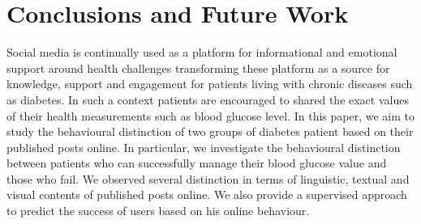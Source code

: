 \documentclass{acm_proc_article-sp}
\begin{document}
\section{Conclusions and Future Work}

Social media is continually used as a platform for informational and emotional support around health challenges transforming these platform as a source for knowledge, support and engagement for patients living with chronic diseases such as diabetes. In such a context patients are encouraged to shared the exact values of their health measurements such as blood glucose level. In this paper, we aim to study the behavioural distinction of two groups of diabetes patient based on their published posts online. In particular, we investigate the behavioural distinction between patients who can successfully manage their blood glucose value and those who fail. We observed several distinction in terms of linguistic, textual and visual contents of published posts online. We also provide a supervised approach to predict the success of users based on his online behaviour.
	


\footnotesize

\end{document}
